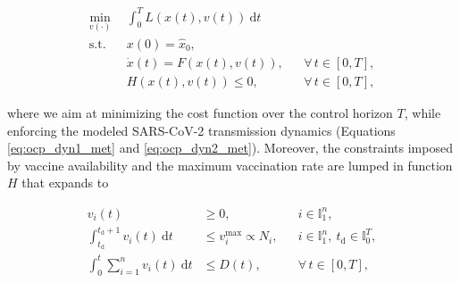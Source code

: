 \begin{subequations}
    \label{eq:ocp_met}
    \begin{align}
        \min_{v(\cdot)} \ \ & \int_{0}^{T} L(x(t),v(t)) \ \mathrm{d}t \\ \label{eq:ocp_dyn1_met}
        \mathrm{s.t.} \ \ & x(0) = \hat x_0, \\ \label{eq:ocp_dyn2_met}
        &\dot x(t) = F(x(t),v(t)), && \forall \, t\in[0,T], \\ 
        &H(x(t),v(t)) \leq 0, && \forall \, t\in[0,T],
    \end{align}
\end{subequations}

where we aim at minimizing the cost function over the control horizon $T$, while enforcing the modeled SARS-CoV-2 transmission dynamics (Equations \eqref{eq:ocp_dyn1_met} and \eqref{eq:ocp_dyn2_met}). Moreover, the constraints imposed by vaccine availability and the maximum vaccination rate are lumped in function $H$ that expands to

\begin{subequations}
    \begin{align}
        v_i(t) &\geq 0, && i\in\mathbb{I}_1^n, \label{eq:constr_vacc_met} \\
        \int_{t_\mathrm{d}}^{t_\mathrm{d}+1} v_i(t) \ \mathrm{d}t &\leq v_i^\mathrm{max} \propto N_i, && i\in\mathbb{I}_1^n,\ t_\mathrm{d} \in \mathbb{I}_0^T,  \label{eq:constr_day_met} \\
        \int_{0}^{t} \sum_{i=1}^n v_i(t) \ \mathrm{d}t &\leq D(t), && \forall \, t\in[0,T], \label{eq:constr_week_met}
    \end{align}
\end{subequations}

